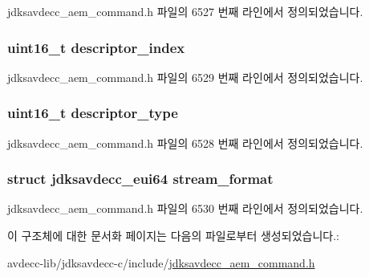 jdksavdecc\+\_\+aem\+\_\+command.\+h 파일의 6527 번째 라인에서 정의되었습니다.

\subsubsection[{\texorpdfstring{descriptor\+\_\+index}{descriptor_index}}]{\setlength{\rightskip}{0pt plus 5cm}uint16\+\_\+t descriptor\+\_\+index}\hypertarget{structjdksavdecc__aem__command__set__stream__format_a042bbc76d835b82d27c1932431ee38d4}{}\label{structjdksavdecc__aem__command__set__stream__format_a042bbc76d835b82d27c1932431ee38d4}


jdksavdecc\+\_\+aem\+\_\+command.\+h 파일의 6529 번째 라인에서 정의되었습니다.

\subsubsection[{\texorpdfstring{descriptor\+\_\+type}{descriptor_type}}]{\setlength{\rightskip}{0pt plus 5cm}uint16\+\_\+t descriptor\+\_\+type}\hypertarget{structjdksavdecc__aem__command__set__stream__format_ab7c32b6c7131c13d4ea3b7ee2f09b78d}{}\label{structjdksavdecc__aem__command__set__stream__format_ab7c32b6c7131c13d4ea3b7ee2f09b78d}


jdksavdecc\+\_\+aem\+\_\+command.\+h 파일의 6528 번째 라인에서 정의되었습니다.

\subsubsection[{\texorpdfstring{stream\+\_\+format}{stream_format}}]{\setlength{\rightskip}{0pt plus 5cm}struct {\bf jdksavdecc\+\_\+eui64} stream\+\_\+format}\hypertarget{structjdksavdecc__aem__command__set__stream__format_a77359be54ea386b1da66597746709ed0}{}\label{structjdksavdecc__aem__command__set__stream__format_a77359be54ea386b1da66597746709ed0}


jdksavdecc\+\_\+aem\+\_\+command.\+h 파일의 6530 번째 라인에서 정의되었습니다.



이 구조체에 대한 문서화 페이지는 다음의 파일로부터 생성되었습니다.\+:\begin{DoxyCompactItemize}
\item 
avdecc-\/lib/jdksavdecc-\/c/include/\hyperlink{jdksavdecc__aem__command_8h}{jdksavdecc\+\_\+aem\+\_\+command.\+h}\end{DoxyCompactItemize}
